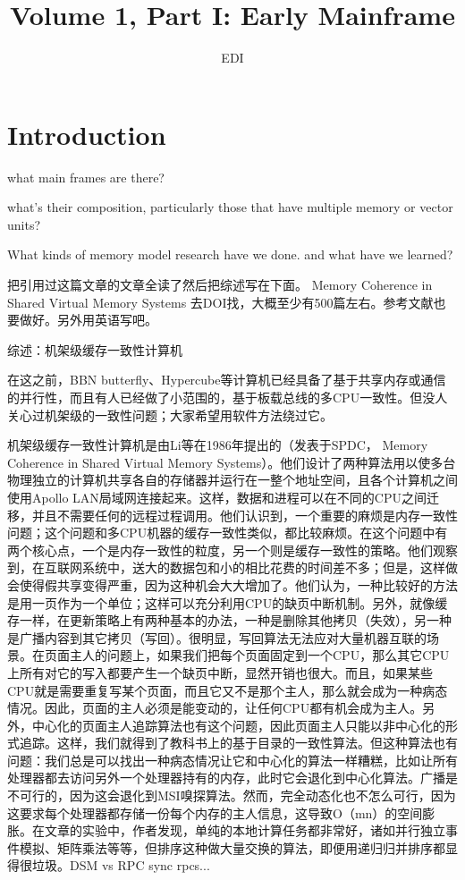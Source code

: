 \documentclass[a4paper,twoside]{scrbook}
\begin{document}
\title{Volume 1, Part I: Early Mainframe}
\author{EDI}
\frontmatter
\maketitle
\tableofcontents
\mainmatter

\chapter{Introduction}

what main frames are there?

what's their composition, particularly those that have multiple memory or vector units?


What kinds of memory model research have we done. and what have we learned?

把引用过这篇文章的文章全读了然后把综述写在下面。
Memory Coherence in Shared Virtual Memory Systems
去DOI找，大概至少有500篇左右。参考文献也要做好。另外用英语写吧。


综述：机架级缓存一致性计算机

在这之前，BBN butterfly、Hypercube等计算机已经具备了基于共享内存或通信的并行性，而且有人已经做了小范围的，基于板载总线的多CPU一致性。但没人关心过机架级的一致性问题；大家希望用软件方法绕过它。

机架级缓存一致性计算机是由Li等在1986年提出的（发表于SPDC， Memory Coherence in Shared Virtual Memory Systems）。他们设计了两种算法用以使多台物理独立的计算机共享各自的存储器并运行在一整个地址空间，且各个计算机之间使用Apollo LAN局域网连接起来。这样，数据和进程可以在不同的CPU之间迁移，并且不需要任何的远程过程调用。他们认识到，一个重要的麻烦是内存一致性问题；这个问题和多CPU机器的缓存一致性类似，都比较麻烦。在这个问题中有两个核心点，一个是内存一致性的粒度，另一个则是缓存一致性的策略。他们观察到，在互联网系统中，送大的数据包和小的相比花费的时间差不多；但是，这样做会使得假共享变得严重，因为这种机会大大增加了。他们认为，一种比较好的方法是用一页作为一个单位；这样可以充分利用CPU的缺页中断机制。另外，就像缓存一样，在更新策略上有两种基本的办法，一种是删除其他拷贝（失效），另一种是广播内容到其它拷贝（写回）。很明显，写回算法无法应对大量机器互联的场景。在页面主人的问题上，如果我们把每个页面固定到一个CPU，那么其它CPU上所有对它的写入都要产生一个缺页中断，显然开销也很大。而且，如果某些CPU就是需要重复写某个页面，而且它又不是那个主人，那么就会成为一种病态情况。因此，页面的主人必须是能变动的，让任何CPU都有机会成为主人。另外，中心化的页面主人追踪算法也有这个问题，因此页面主人只能以非中心化的形式追踪。这样，我们就得到了教科书上的基于目录的一致性算法。但这种算法也有问题：我们总是可以找出一种病态情况让它和中心化的算法一样糟糕，比如让所有处理器都去访问另外一个处理器持有的内存，此时它会退化到中心化算法。广播是不可行的，因为这会退化到MSI嗅探算法。然而，完全动态化也不怎么可行，因为这要求每个处理器都存储一份每个内存的主人信息，这导致O（mn）的空间膨胀。在文章的实验中，作者发现，单纯的本地计算任务都非常好，诸如并行独立事件模拟、矩阵乘法等等，但排序这种做大量交换的算法，即便用递归归并排序都显得很垃圾。DSM vs RPC sync rpcs... 
\end{document}
